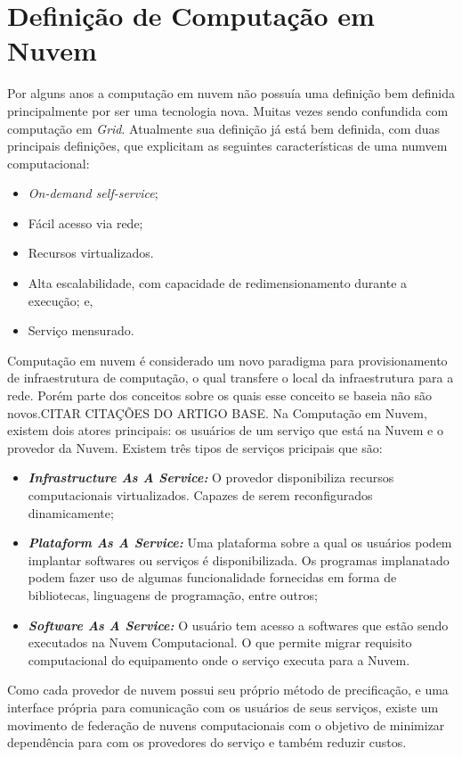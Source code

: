 \section{Definição de Computação em Nuvem}

Por alguns anos a computação em nuvem não possuía uma definição bem definida principalmente por ser uma tecnologia nova. Muitas vezes sendo confundida com computação em \textit{Grid}. Atualmente sua definição já está bem definida, com duas principais definições\cite{NIST_CLOUD_DEFINITION}\cite{Vaquero:2008:BCT:1496091.1496100_Cloud_definition}, que explicitam as seguintes características de uma numvem computacional: 

\begin{itemize}
	\item \textit{On-demand self-service};
	\item Fácil acesso via rede;
	\item Recursos virtualizados.
	\item Alta escalabilidade, com capacidade de redimensionamento durante a execução; e,
	\item Serviço mensurado.
\end{itemize}

Computação em nuvem é considerado um novo paradigma para provisionamento de infraestrutura de computação, o qual transfere o local da infraestrutura para a rede. Porém parte dos conceitos sobre os quais esse conceito se baseia não são novos.\cite{Vaquero:2008:BCT:1496091.1496100_Cloud_definition}CITAR CITAÇÕES DO ARTIGO BASE.
Na Computação em Nuvem, existem dois atores principais: os usuários de um serviço que está na Nuvem e o provedor da Nuvem. Existem três tipos de serviços pricipais que são\cite{NIST_CLOUD_DEFINITION}:

\begin{itemize}
	\item \textbf{\textit{Infrastructure As A Service:}} O provedor disponibiliza recursos computacionais virtualizados. Capazes de serem reconfigurados dinamicamente;
	\item \textbf{\textit{Plataform As A Service:}} Uma plataforma sobre a qual os usuários podem implantar softwares ou serviços é disponibilizada. Os programas implanatado podem fazer uso de algumas funcionalidade fornecidas em forma de bibliotecas, linguagens de programação, entre outros;
	\item \textbf{\textit{Software As A Service:}} O usuário tem acesso a softwares que estão sendo executados na Nuvem Computacional. O que permite migrar requisito computacional do equipamento onde o serviço executa para a Nuvem.
\end{itemize}

Como cada provedor de nuvem possui seu próprio método de precificação, e uma interface própria para comunicação com os usuários de seus serviços, existe um movimento de federação de nuvens computacionais com o objetivo de minimizar dependência para com os provedores do serviço e também reduzir custos.
